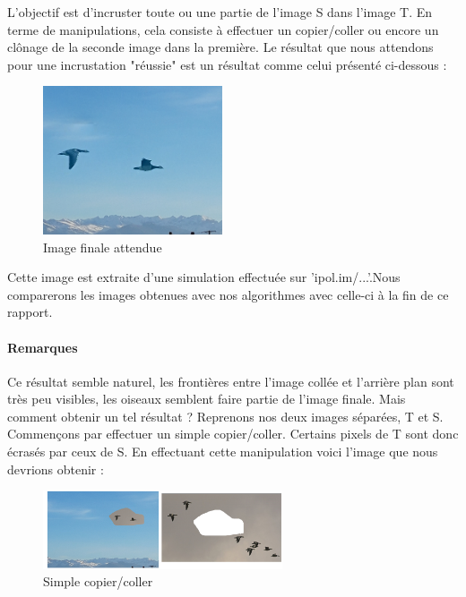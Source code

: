L'objectif est d'incruster toute ou une partie de l'image S dans l'image T. En terme de manipulations, cela consiste à effectuer un copier/coller ou encore un clônage de la seconde image dans la première.
Le résultat que nous attendons pour une incrustation "réussie" est un résultat comme celui présenté ci-dessous : 
    
\begin{center}
\begin{figure}[!htb]
   \centering
     \includegraphics[width = 150pt]{Images/clonage_done.png}
     \caption{Image  finale attendue}
\end{figure}
\end{center}
Cette image est extraite d'une simulation effectuée sur 'ipol.im/...'.Nous comparerons les images obtenues avec nos algorithmes avec celle-ci à la fin de ce rapport.\newline
\paragraph{Remarques}
Ce résultat semble naturel, les frontières entre l'image collée et l'arrière plan sont très peu visibles, les oiseaux semblent faire partie de l'image finale.
Mais comment obtenir un tel résultat ? 
\newline
Reprenons nos deux images séparées, T et S.  Commençons par effectuer un simple copier/coller. Certains pixels de T sont donc écrasés par ceux de S. En effectuant cette manipulation voici l'image que nous devrions obtenir : 
\begin{center}
\begin{figure}[H]
     \centering
     \includegraphics[width = 200pt]{Images/collage1.jpg}
     \caption{Simple copier/coller}
\end{figure}
\end{center}

